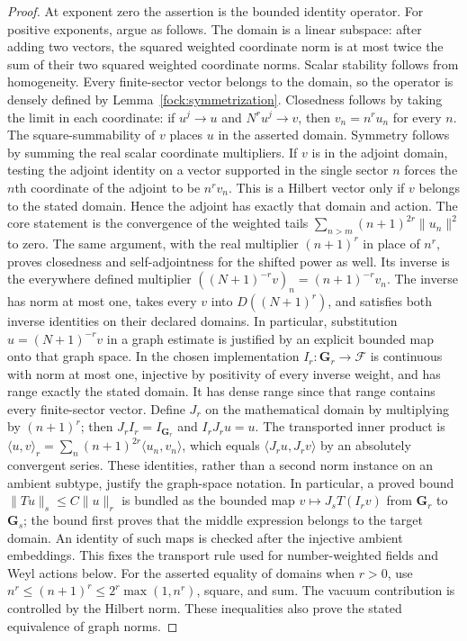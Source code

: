 \documentclass[11pt,a4paper]{article}
\theoremstyle{definition}
\theoremstyle{remark}
\begin{document}
\begin{proof}
At exponent zero the assertion is the bounded identity operator.
For positive exponents, argue as follows.
The domain is a linear subspace: after adding two vectors, the
squared weighted coordinate norm is at most twice the sum of their
two squared weighted coordinate norms. Scalar stability follows from
homogeneity. Every finite-sector vector belongs to the domain, so
the operator is densely defined by Lemma~\ref{fock:symmetrization}.
Closedness follows by taking the limit in each coordinate: if $u^j\to u$
and $N^ru^j\to v$, then $v_n=n^ru_n$ for every $n$. The square-summability
of $v$ places $u$ in the asserted domain. Symmetry follows by summing the
real scalar coordinate multipliers. If $v$ is in the adjoint domain,
testing the adjoint identity on a vector supported in the single sector
$n$ forces the $n$th coordinate of the adjoint to be $n^rv_n$. This is a
Hilbert vector only if $v$ belongs to the stated domain. Hence the adjoint
has exactly that domain and action. The core statement is the convergence
of the weighted tails
$\sum_{n>m}(n+1)^{2r}\|u_n\|^2$ to zero.
The same argument, with the real multiplier $(n+1)^r$ in place
of $n^r$, proves closedness and self-adjointness for the shifted
power as well. Its inverse is the everywhere defined multiplier
$((N+1)^{-r}v)_n=(n+1)^{-r}v_n$. The inverse has norm at most one,
takes every $v$ into $D((N+1)^r)$, and satisfies both inverse
identities on their declared domains. In particular, substitution
$u=(N+1)^{-r}v$ in a graph estimate is justified by an explicit
bounded map onto that graph space.
In the chosen implementation $I_r:\mathbf G_r\to\mathcal F$
is continuous with norm at most one, injective by positivity of
every inverse weight, and has range exactly the stated domain.
It has dense range since that range contains every finite-sector
vector. Define $J_r$ on the mathematical domain by multiplying by
$(n+1)^r$; then $J_rI_r=I_{\mathbf G_r}$ and $I_rJ_ru=u$.
The transported inner product is
$\langle u,v\rangle_r=\sum_n(n+1)^{2r}\langle u_n,v_n\rangle$,
which equals $\langle J_ru,J_rv\rangle$ by an absolutely
convergent series. These identities, rather than a second norm
instance on an ambient subtype, justify the graph-space notation.
In particular, a proved bound
$\|Tu\|_s\leq C\|u\|_r$ is bundled as the bounded map
$v\mapsto J_sT(I_rv)$ from $\mathbf G_r$ to $\mathbf G_s$;
the bound first proves that the middle expression belongs to
the target domain. An identity of such maps is checked after
the injective ambient embeddings. This fixes the transport rule
used for number-weighted fields and Weyl actions below.
For the asserted equality of domains when $r>0$, use
$n^r\leq(n+1)^r\leq2^r\max(1,n^r)$, square, and sum. The vacuum
contribution is controlled by the Hilbert norm. These inequalities
also prove the stated equivalence of graph norms.
\end{proof}
\end{document}
